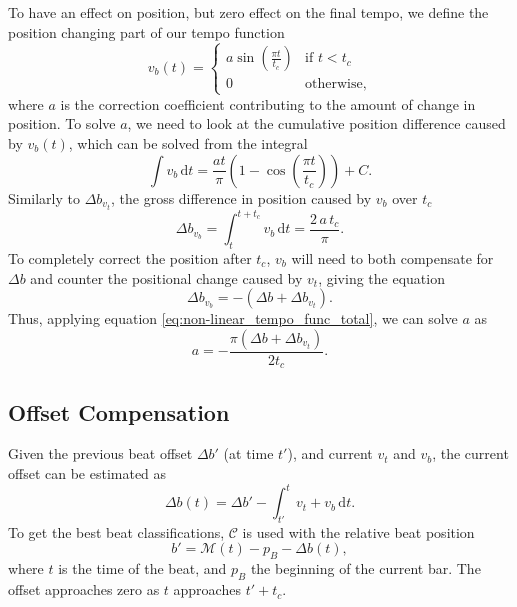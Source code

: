 To have an effect on position,
but zero effect on the final tempo,
we define the position changing part of our tempo function
\begin{equation}
v_b(t) =
\begin{cases}
a \sin \left( \frac{\pi t}{t_c} \right) & \text{if } t < t_c \\
0 & \text{otherwise},
\end{cases}
\end{equation}
where $a$ is the correction coefficient
contributing to the amount of change in position.
To solve $a$, we need to look at the
cumulative position difference caused by $v_b(t)$,
which can be solved from the integral
\begin{equation}
\int v_b \, \mathrm{d}t =
\frac{a t}{\pi} \left( 1 - \cos \left( \frac{\pi t}{t_c} \right) \right) + C.
\end{equation}
Similarly to $\Delta b_{v_t}$,
the gross difference in position caused by $v_b$ over $t_c$
\begin{equation}
\label{eq:non-linear_tempo_func_total}
\Delta b_{v_b} = \int_t^{t + t_c} v_b \, \mathrm{d}t =
\frac{2 \, a \, t_c}{\pi}.
\end{equation}
To completely correct the position after $t_c$,
$v_b$ will need to both compensate for
$\Delta b$ and counter the positional change caused by $v_t$,
giving the equation
\begin{equation}
\Delta b_{v_b} = - \left( \Delta b + \Delta b_{v_t} \right) .
\end{equation}
Thus, applying equation \ref{eq:non-linear_tempo_func_total},
we can solve $a$ as
\begin{equation}
\label{eq:non_linear_coef}
a = - \frac{\pi \left( \Delta b + \Delta b_{v_t} \right)}{2 t_c}.
\end{equation}

\subsection{Offset Compensation}

Given the previous beat offset $\Delta b'$ (at time $t'$),
and current $v_t$ and $v_b$,
the current offset can be estimated as
\begin{equation}
\label{eq:tempo_function_offset_function}
\Delta b(t) = \Delta b' - \int_{t'}^t v_t + v_b \, \mathrm{d}t.
\end{equation}
To get the best beat classifications,
$ \mathcal{C} $ is used with the relative beat position
\begin{equation}
b' = \mathcal{M} \left ( t \right ) - p_B - \Delta b(t),
\end{equation}
where $t$ is the time of the beat,
and $p_B$ the beginning of the current bar.
The offset approaches zero as $t$ approaches $t' + t_c$.

